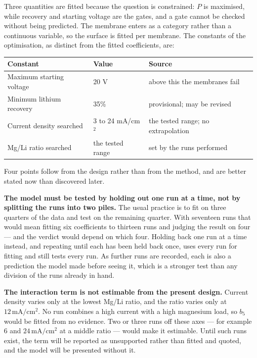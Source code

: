 \documentclass[11pt,a4paper]{article}
\newcommand{\unit}[1]{\,\mathrm{#1}}
\begin{document}
Three quantities are fitted because the question is constrained: $P$ is maximised, while
recovery and starting voltage are the gates, and a gate cannot be checked without being
predicted. The membrane enters as a category rather than a continuous variable, so the surface
is fitted per membrane. The constants of the optimisation, as distinct from the fitted
coefficients, are:

\begin{center}
\small
\begin{tabular}{@{}l l l@{}}
\toprule
Constant & Value & Source \\
\midrule
Maximum starting voltage & 20 V & above this the membranes fail \\
Minimum lithium recovery & 35\% & provisional; may be revised \\
Current density searched & 3 to 24 mA/cm$^2$ & the tested range; no extrapolation \\
Mg/Li ratio searched & the tested range & set by the runs performed \\
\bottomrule
\end{tabular}
\end{center}

Four points follow from the design rather than from the method, and are better stated now than
discovered later.

\textbf{The model must be tested by holding out one run at a time, not by splitting the runs
into two piles.} The usual practice is to fit on three quarters of the data and test on the
remaining quarter. With seventeen runs that would mean fitting six coefficients to thirteen runs
and judging the result on four --- and the verdict would depend on which four. Holding back one
run at a time instead, and repeating until each has been held back once, uses every run for
fitting and still tests every run. As further runs are recorded, each is also a prediction the
model made before seeing it, which is a stronger test than any division of the runs already in
hand.

\textbf{The interaction term is not estimable from the present design.} Current density varies
only at the lowest Mg/Li ratio, and the ratio varies only at $12\unit{mA/cm^2}$. No run
combines a high current with a high magnesium load, so $b_5$ would be fitted from no evidence.
Two or three runs off these axes --- for example $6$ and $24\unit{mA/cm^2}$ at a middle ratio
--- would make it estimable. Until such runs exist, the term will be reported as unsupported
rather than fitted and quoted, and the model will be presented without it.
\end{document}
